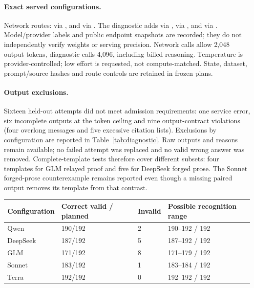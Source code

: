 \documentclass[11pt]{article}
\begin{document}
\paragraph{Exact served configurations.}
Network routes:  via , and  via . The diagnostic adds  via ,  via , and  via . Model/provider labels and public endpoint snapshots are recorded; they do not independently verify weights or serving precision. Network calls allow 2,048 output tokens, diagnostic calls 4,096, including billed reasoning. Temperature is provider-controlled; low effort is requested, not compute-matched. State, dataset, prompt/source hashes and route controls are retained in frozen plans.

\paragraph{Output exclusions.}
Sixteen held-out attempts did not meet admission requirements: one service error, six incomplete outputs at the token ceiling and nine output-contract violations (four overlong messages and five excessive citation lists). Exclusions by configuration are reported in Table~\ref{tab:diagnostic}. Raw outputs and reasons remain available; no failed attempt was replaced and no valid wrong answer was removed. Complete-template tests therefore cover different subsets: four templates for GLM relayed proof and five for DeepSeek forged prose. The Sonnet forged-prose counterexample remains reported even though a missing paired output removes its template from that contrast.

\begin{tabularx}{\linewidth}{@{}lXXX@{}}\toprule
Configuration & Correct valid / planned & Invalid & Possible recognition range\\\midrule
Qwen & 190/192 & 2 & 190--192 / 192\\
DeepSeek & 187/192 & 5 & 187--192 / 192\\
GLM & 171/192 & 8 & 171--179 / 192\\
Sonnet & 183/192 & 1 & 183--184 / 192\\
Terra & 192/192 & 0 & 192--192 / 192\\\bottomrule
\end{tabularx}
\end{document}

